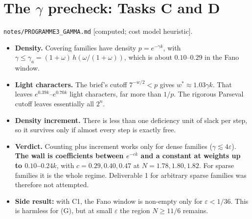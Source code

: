 \documentclass[11pt]{article}
\newcommand{\lvl}[1]{\textsf{\small[#1]}}
\begin{document}
\section{The $\gamma$ precheck: Tasks C and D}
\texttt{notes/PROGRAMME3\_GAMMA.md} \lvl{computed; cost model heuristic}.
\begin{itemize}
\item \textbf{Density.} Covering families have density $p=e^{-\gamma k}$, with $\gamma\le\gamma_a=(1+\omega)\,h(\omega/(1+\omega))$,
which is about $0.10$--$0.29$ in the Fano window.
\item \textbf{Light characters.} The brief's cutoff $7^{-w/2}<p$ gives $w^*\approx1.03\gamma k$. That leaves
$e^{0.39k}$--$e^{0.70k}$ light characters, far more than $1/p$. The rigorous Parseval cutoff leaves essentially all $2^n$.
\item \textbf{Density increment.} There is less than one deficiency unit of slack per step, so it survives only if almost
every step is exactly free.
\item \textbf{Verdict.} Counting plus increment works only for dense families ($\gamma\lesssim4\varepsilon$). \textbf{The wall
is coefficients between $e^{-ck}$ and a constant at weights up to $0.10$--$0.24k$}, with $c=0.29,0.40,0.47$ at
$N=1.78,1.80,1.82$. For sparse families it is the whole regime. Deliverable 1 for arbitrary sparse families was therefore not
attempted.
\item \textbf{Side result:} with C1, the Fano window is non-empty only for $\varepsilon<1/36$. This is harmless for (G), but at
small $\varepsilon$ the region $N\ge11/6$ remains.
\end{itemize}
\end{document}
